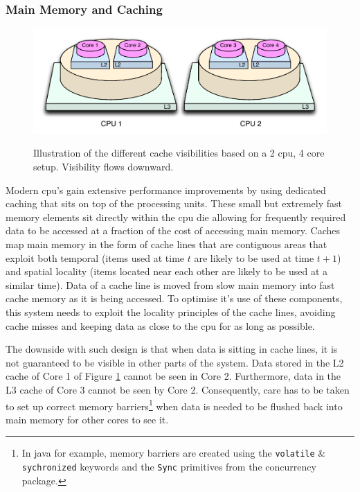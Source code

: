 \documentclass[a4paper,11pt]{scrreprt}
\begin{document}
\subsubsection{Main Memory and Caching}
\begin{figure}[h]
\centering
\caption{Illustration of the different cache visibilities based on a 2 \acrshort{cpu}, 4 core setup. Visibility flows downward.}
\includegraphics[scale=0.65] {cachelevels.pdf}
\label{fig:corecachedesign}
\end{figure}
Modern \acrshort{cpu}'s gain extensive performance improvements by using dedicated caching that sits on top of the processing units. These small but extremely fast memory elements sit directly within the \acrshort{cpu} die allowing for frequently required data to be accessed at a fraction of the cost of accessing main memory. Caches map main memory in the form of cache lines that are contiguous areas that exploit both temporal (items used at time \(t\) are likely to be used at time \(t+1\)) and spatial locality (items located near each other are likely to be used at a similar time). Data of a cache line is moved from slow main memory into fast cache memory as it is being accessed. To optimise it's use of these components, this system needs to exploit the locality principles of the cache lines, avoiding cache misses and keeping data as close to the \acrshort{cpu} for as long as possible. 

The downside with such design is that when data is sitting in cache lines, it is not guaranteed to be visible in other parts of the system. Data stored in the L2 cache of Core 1 of Figure \ref{fig:corecachedesign} cannot be seen in Core 2. Furthermore, data in the L3 cache of Core 3 cannot be seen by Core 2. Consequently, care has to be taken to set up correct memory barriers\footnote{In java for example, memory barriers are created using the \texttt{volatile} \& \texttt{sychronized} keywords and the \texttt{Sync} primitives from the concurrency package.} when data is needed to be flushed back into main memory for other cores to see it.
\end{document}
